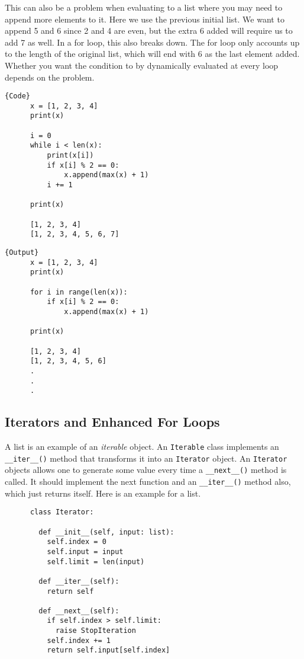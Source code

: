 \documentclass{article}
\begin{document}
    This can also be a problem when evaluating to a list where you may need to append more elements to it. Here we use the previous initial list. We want to append 5 and 6 since 2 and 4 are even, but the extra 6 added will require us to add 7 as well.   In a for loop, this also breaks down. The for loop only accounts up to the length of the original list, which will end with 6 as the last element added. Whether you want the condition to by dynamically evaluated at every loop depends on the problem. 

    \noindent\begin{minipage}{.5\textwidth}
    \begin{lstlisting}[]{Code}
      x = [1, 2, 3, 4] 
      print(x)

      i = 0 
      while i < len(x): 
          print(x[i])
          if x[i] % 2 == 0: 
              x.append(max(x) + 1) 
          i += 1

      print(x)

      [1, 2, 3, 4]
      [1, 2, 3, 4, 5, 6, 7] 
    \end{lstlisting}
    \end{minipage}
    \hfill
    \begin{minipage}{.49\textwidth}
    \begin{lstlisting}[]{Output}
      x = [1, 2, 3, 4]
      print(x)

      for i in range(len(x)): 
          if x[i] % 2 == 0: 
              x.append(max(x) + 1) 

      print(x)

      [1, 2, 3, 4]
      [1, 2, 3, 4, 5, 6]
      .
      .
      .
    \end{lstlisting}
    \end{minipage}

  \subsection{Iterators and Enhanced For Loops}

    A list is an example of an \textit{iterable} object. An \texttt{Iterable} class implements an \texttt{\_\_iter\_\_()} method that transforms it into an \texttt{Iterator} object. An \texttt{Iterator} objects allows one to generate some value every time a \texttt{\_\_next\_\_()} method is called. It should implement the next function and an \texttt{\_\_iter\_\_()} method also, which just returns itself. Here is an example for a list. 

    \begin{lstlisting}
      class Iterator: 

        def __init__(self, input: list): 
          self.index = 0 
          self.input = input
          self.limit = len(input)

        def __iter__(self): 
          return self

        def __next__(self): 
          if self.index > self.limit: 
            raise StopIteration
          self.index += 1 
          return self.input[self.index]
    \end{lstlisting}
\end{document}
